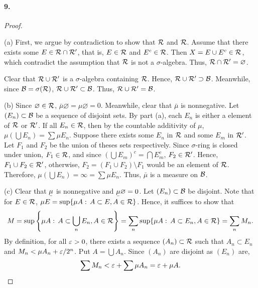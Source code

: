  \paragraph{9.}
  \begin{proof}
    $\,$\par
    (a) First, we argue by contradiction to show that $\mathcal{R}$ and $\mathcal{R}$.
    Assume that there exists some $E\in\mathcal{R}\cap\mathcal{R}^\prime$, that is, $E\in
    \mathcal{R}$ and $E^c\in\mathcal{R}$. Then $X=E\cup E^c\in\mathcal{R}$, which 
    contradict the assumption that $\mathcal{R}$ is not a $\sigma$-algebra. Thus,
    $\mathcal{R}\cap\mathcal{R}^\prime=\varnothing$.\par
    Clear that $\mathcal{R}\cup\mathcal{R}^\prime$ is a $\sigma$-algebra containing 
    $\mathcal{R}$. Hence, $\mathcal{R}\cup\mathcal{R}^\prime\supset\mathcal{B}$. Meanwhile, since
    $\mathcal{B}=\sigma(\mathcal{R})$, $\mathcal{R}\cup\mathcal{R}^\prime\subset\mathcal{B}$. Thus,
    $\mathcal{R}\cup\mathcal{R}^\prime=\mathcal{B}$.\par
    (b) Since $\varnothing\in\mathcal{R}$, $\bar{\mu}\varnothing=\mu\varnothing=0$.
    Meanwhile, clear that $\bar{\mu}$ is nonnegative. Let $(E_n)\subset\mathcal{B}$
    be a sequence of disjoint sets. By part (a), each $E_n$ is either a element
    of $\mathcal{R}$ or $\mathcal{R}^\prime$. If all $E_n\in\mathcal{R}$, then by the 
    countable additivity of $\mu$, $\mu(\bigcup E_n)=\sum\mu E_n$. Suppose there 
    exists some $E_n$ in $\mathcal{R}$ and some $E_m$ in $\mathcal{R}^\prime$. Let $F_1$ 
    and $F_2$ be the union of theses sets respectively. Since $\sigma$-ring is 
    closed under union, $F_1\in\mathcal{R}$, and since $(\bigcup E_m)^c=\bigcap 
    E_m^c$, $F_2\in\mathcal{R^\prime}$. Hence, $F_1\cup F_2\in\mathcal{R}^\prime$, otherwise,
    $F_2=(F_1\cup F_2)\setminus F_1$ would be an element of $\mathcal{R}$. 
    Therefore, $\mu(\bigcup E_n)=\infty=\sum\mu E_n$. Thus, $\bar{\mu}$ is a 
    measure on $\mathcal{B}$.\par
    (c) Clear that $\ubar{\mu}$ is nonnegative and $\ubar{\mu}\varnothing=0$.
    Let $(E_n)\subset\mathcal{B}$ be disjoint. Note that for $E\in\mathcal{R}$, $\mu 
    E=\sup\{\mu A:\,A\subset E,A\in\mathcal{R}\}$. Hence, it suffices to show that
    \[
      M=\sup\left\{\mu A:\, A\subset\bigcup_n E_n,A\in\mathcal{R}\right\}=
      \sum_n\sup\{\mu A:\, A\subset E_n,A\in\mathcal{R}\}=\sum_n M_n.
    \]
    By definition, for all $\varepsilon>0$, there exists a sequence $(A_n)\subset
    \mathcal{R}$ such that $A_n\subset E_n$ and $M_n<\mu A_n+\varepsilon/2^n$. Put $A=
    \bigcup A_n$. Since $(A_n)$ are disjoint as $(E_n)$ are, 
    \[
      \sum M_n < \varepsilon+\sum\mu A_n =\varepsilon+\mu A.
\]
\end{proof}
